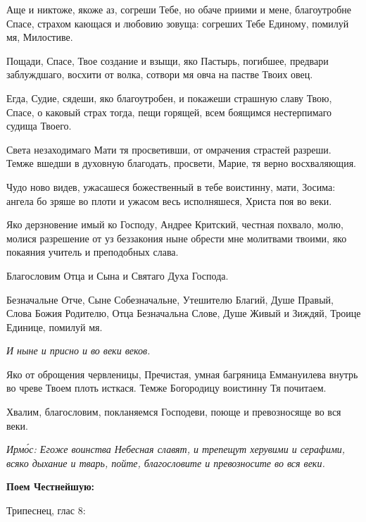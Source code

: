 Аще и никтоже, якоже аз, согреши Тебе, но обаче приими и мене, благоутробне Спасе, страхом кающася и любовию зовуща: согреших Тебе Единому, помилуй мя, Милостиве.

Пощади, Спасе, Твое создание и взыщи, яко Пастырь, погибшее, предвари заблуждшаго, восхити от волка, сотвори мя овча на пастве Твоих овец.

Егда, Судие, сядеши, яко благоутробен, и покажеши страшную славу Твою, Спасе, о каковый страх тогда, пещи горящей, всем боящимся нестерпимаго судища Твоего.


Света незаходимаго Мати тя просветивши, от омрачения страстей разреши. Темже вшедши в духовную благодать, просвети, Марие, тя верно восхваляющия.


Чудо ново видев, ужасашеся божественный в тебе воистинну, мати, Зосима: ангела бо зряше во плоти и ужасом весь исполняшеся, Христа поя во веки.


Яко дерзновение имый ко Господу, Андрее Критский, честная похвало, молю, молися разрешение от уз беззакония ныне обрести мне молитвами твоими, яко покаяния учитель и преподобных слава.

Благословим Отца и Сына и Святаго Духа Господа.

Безначальне Отче, Сыне Собезначальне, Утешителю Благий, Душе Правый, Слова Божия Родителю, Отца Безначальна Слове, Душе Живый и Зиждяй, Троице Единице, помилуй мя.

\itshape И ныне\normalfont{} и присно и во веки веков.

Яко от оброщения червленицы, Пречистая, умная багряница Еммануилева внутрь во чреве Твоем плоть исткася. Темже Богородицу воистинну Тя почитаем.

Хвалим, благословим, покланяемся Господеви, поюще и превозносяще во вся веки.

\itshape Ирм\'{о}с\normalfont{}: Егоже воинства Небесная славят, и трепещут херувими и серафими, всяко дыхание и тварь, пойте, благословите и превозносите во вся веки. 

\medskip\bfseries Поем Честнейшую:

Трипеснец, глас 8:\normalfont{}


